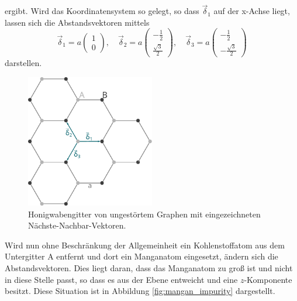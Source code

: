 ergibt.
Wird das Koordinatensystem so gelegt, so dass $\vec{\delta}_1$ auf der x-Achse liegt, lassen sich die Abstandsvektoren mittels 
\begin{equation*}
    \vec{\delta}_1 = a \begin{pmatrix} 1            \\[4pt] 0                   \end{pmatrix}, \quad
    \vec{\delta}_2 = a \begin{pmatrix} -\frac{1}{2} \\[4pt] \frac{\sqrt{3}}{2}  \end{pmatrix}, \quad 
    \vec{\delta}_3 = a \begin{pmatrix} -\frac{1}{2} \\[4pt] -\frac{\sqrt{3}}{2} \end{pmatrix}
\end{equation*}
darstellen. \\
\begin{figure}
    \centering
    \includegraphics[width = 0.5\textwidth]{Plots/graphene_lattice.pdf}
    \caption{Honigwabengitter von ungestörtem Graphen mit eingezeichneten Nächste-Nachbar-Vektoren.}
    \label{fig:graphene_lattice}
\end{figure}
Wird nun ohne Beschränkung der Allgemeinheit ein Kohlenstoffatom aus dem Untergitter A entfernt und dort ein Manganatom eingesetzt, ändern sich die
Abstandsvektoren. 
Dies liegt daran, dass das Manganatom zu groß ist und nicht in diese Stelle passt, so dass es aus der Ebene entweicht und eine $z$-Komponente besitzt.
Diese Situation ist in Abbildung \ref{fig:mangan_impurity} dargestellt.
